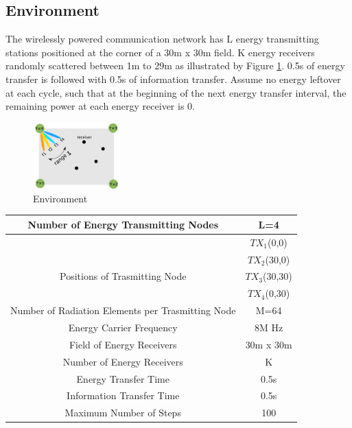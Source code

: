 \documentclass[journal]{IEEEtran}
\begin{document}
\subsection{Environment}
The wirelessly powered communication network has L energy transmitting stations positioned at the corner of a 30m x 30m field. K energy receivers randomly scattered between 1m to 29m as illustrated by Figure \ref{fig:environment}. 0.5s of energy transfer is followed with 0.5s of information transfer. Assume no energy leftover at each cycle, such that at the beginning of the next energy transfer interval, the remaining power at each energy receiver is 0.


\begin{figure}[H]
\centering
\includegraphics[width=0.3\textwidth]{environment.png}
\caption{Environment}
\label{fig:environment}
\end{figure}


\begin{small}
\begin{center}
\begin{tabular}{ c c }
\hline
Number of Energy Transmitting Nodes & L=4\\
\hline
&$TX_1$(0,0)\\
&$TX_2$(30,0)\\
{Positions of Trasmitting Node}&$TX_3$(30,30)\\
&$TX_4$(0,30)\\
\hline
Number of Radiation Elements per Trasmitting Node & M=64\\
\hline
Energy Carrier Frequency & 8M Hz\\
\hline
Field of Energy Receivers & 30m x 30m\\
\hline
Number of Energy Receivers & K \\
\hline
Energy Transfer Time & 0.5s \\
\hline
Information Transfer Time & 0.5s\\
\hline
Maximum Number of Steps & 100\\
\hline

\end{tabular}
\end{center}
\end{small}
\end{document}
